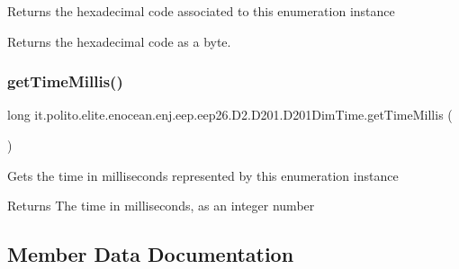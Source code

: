 Returns the hexadecimal code associated to this enumeration instance

\begin{DoxyReturn}{Returns}
the hexadecimal code as a byte. 
\end{DoxyReturn}
\hypertarget{enumit_1_1polito_1_1elite_1_1enocean_1_1enj_1_1eep_1_1eep26_1_1_d2_1_1_d201_1_1_d201_dim_time_a13499cf7f364b68589148a4fbe06b162}{}\label{enumit_1_1polito_1_1elite_1_1enocean_1_1enj_1_1eep_1_1eep26_1_1_d2_1_1_d201_1_1_d201_dim_time_a13499cf7f364b68589148a4fbe06b162} 
\subsubsection{\texorpdfstring{get\+Time\+Millis()}{getTimeMillis()}}
{\footnotesize\ttfamily long it.\+polito.\+elite.\+enocean.\+enj.\+eep.\+eep26.\+D2.\+D201.\+D201\+Dim\+Time.\+get\+Time\+Millis (\begin{DoxyParamCaption}{ }\end{DoxyParamCaption})}

Gets the time in milliseconds represented by this enumeration instance

\begin{DoxyReturn}{Returns}
The time in milliseconds, as an integer number 
\end{DoxyReturn}


\subsection{Member Data Documentation}
\hypertarget{enumit_1_1polito_1_1elite_1_1enocean_1_1enj_1_1eep_1_1eep26_1_1_d2_1_1_d201_1_1_d201_dim_time_af004946a6857ba3350dee42ba50c5e2a}{}\label{enumit_1_1polito_1_1elite_1_1enocean_1_1enj_1_1eep_1_1eep26_1_1_d2_1_1_d201_1_1_d201_dim_time_af004946a6857ba3350dee42ba50c5e2a} 
